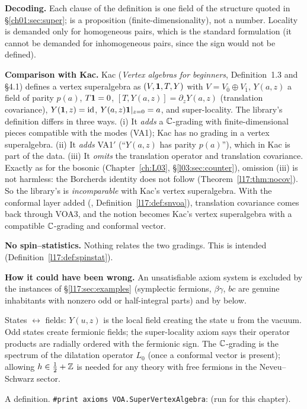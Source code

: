 \begin{dictionary}
\textbf{Decoding.} Each clause of the definition is one field of the structure quoted in
§\ref{ch01:sec:super};  is a proposition (finite-dimensionality), not a number. Locality
is demanded only for homogeneous pairs, which is the standard formulation (it cannot be demanded for
inhomogeneous pairs, since the sign would not be defined).

\textbf{Comparison with Kac.} Kac (\emph{Vertex algebras for beginners}, Definition~1.3 and §4.1)
defines a vertex superalgebra as $(V,\mathbf{1},T,Y)$ with $V=V_{\bar0}\oplus V_{\bar1}$, $Y(a,z)$ a
field of parity $p(a)$, $T\mathbf{1}=0$, $[T,Y(a,z)]=\partial_zY(a,z)$ (translation covariance),
$Y(\mathbf{1},z)=\mathrm{id}$, $Y(a,z)\mathbf{1}|_{z=0}=a$, and super-locality. The library's
definition differs in three ways. (i) It \emph{adds} a ${\mathbb{C}}$-grading with finite-dimensional pieces
compatible with the modes (VA1); Kac has no grading in a vertex superalgebra. (ii) It \emph{adds}
VA1$'$ (``$Y(a,z)$ has parity $p(a)$''), which in Kac is part of the data. (iii) It \emph{omits} the
translation operator and translation covariance. Exactly as for the bosonic 
(Chapter~\ref{ch:L03}, §\ref{l03:sec:counter}), omission (iii) is not harmless: the Borcherds identity
does not follow (Theorem~\ref{l17:thm:nocov}). So the library's  is
\emph{incomparable} with Kac's vertex superalgebra. With the conformal layer added
(, Definition~\ref{l17:def:snvoa}), translation covariance comes back through
VOA3, and the notion becomes Kac's vertex superalgebra with a compatible ${\mathbb{C}}$-grading and conformal
vector.

\textbf{No spin--statistics.} Nothing relates the two gradings. This is intended
(Definition~\ref{l17:def:spinstat}).

\textbf{How it could have been wrong.} An unsatisfiable axiom system is excluded by the instances of
§\ref{l17:sec:examples} (symplectic fermions, $\beta\gamma$, $bc$ are genuine inhabitants with
nonzero odd or half-integral parts) and by  below.
\end{dictionary}
\begin{physics}
States $\leftrightarrow$ fields: $Y(u,z)$ is the local field creating the state $u$ from the vacuum.
Odd states create fermionic fields; the super-locality axiom says their operator products are
radially ordered with the fermionic sign. The ${\mathbb{C}}$-grading is the spectrum of the dilatation operator
$L_0$ (once a conformal vector is present); allowing $h\in\frac12+{\mathbb{Z}}$ is needed for any theory with
free fermions in the Neveu--Schwarz sector.
\end{physics}
\begin{status}
A definition. \texttt{\#print axioms VOA.SuperVertexAlgebra}:  (run for this chapter).
\end{status}

